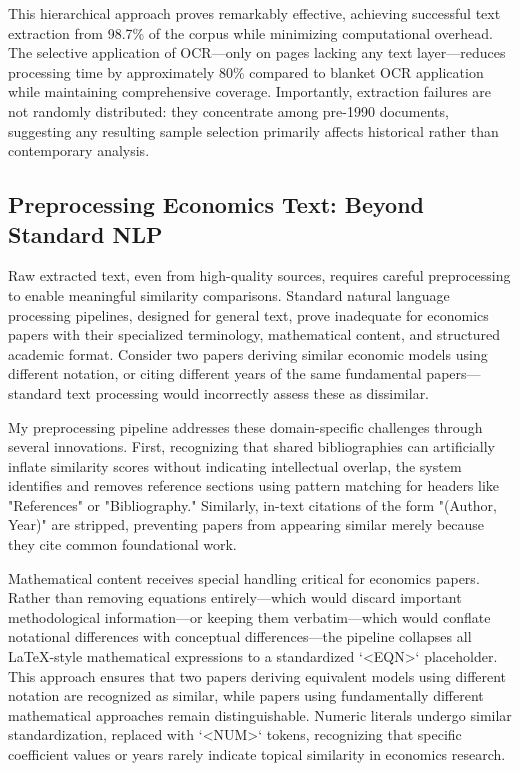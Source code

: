 \documentclass[12pt]{article}
\begin{document}
This hierarchical approach proves remarkably effective, achieving successful text extraction from 98.7\% of the corpus while minimizing computational overhead. The selective application of OCR—only on pages lacking any text layer—reduces processing time by approximately 80\% compared to blanket OCR application while maintaining comprehensive coverage. Importantly, extraction failures are not randomly distributed: they concentrate among pre-1990 documents, suggesting any resulting sample selection primarily affects historical rather than contemporary analysis.

\subsection{Preprocessing Economics Text: Beyond Standard NLP}

Raw extracted text, even from high-quality sources, requires careful preprocessing to enable meaningful similarity comparisons. Standard natural language processing pipelines, designed for general text, prove inadequate for economics papers with their specialized terminology, mathematical content, and structured academic format. Consider two papers deriving similar economic models using different notation, or citing different years of the same fundamental papers—standard text processing would incorrectly assess these as dissimilar.

My preprocessing pipeline addresses these domain-specific challenges through several innovations. First, recognizing that shared bibliographies can artificially inflate similarity scores without indicating intellectual overlap, the system identifies and removes reference sections using pattern matching for headers like "References" or "Bibliography." Similarly, in-text citations of the form "(Author, Year)" are stripped, preventing papers from appearing similar merely because they cite common foundational work.

Mathematical content receives special handling critical for economics papers. Rather than removing equations entirely—which would discard important methodological information—or keeping them verbatim—which would conflate notational differences with conceptual differences—the pipeline collapses all LaTeX-style mathematical expressions to a standardized `<EQN>` placeholder. This approach ensures that two papers deriving equivalent models using different notation are recognized as similar, while papers using fundamentally different mathematical approaches remain distinguishable. Numeric literals undergo similar standardization, replaced with `<NUM>` tokens, recognizing that specific coefficient values or years rarely indicate topical similarity in economics research.
\end{document}
